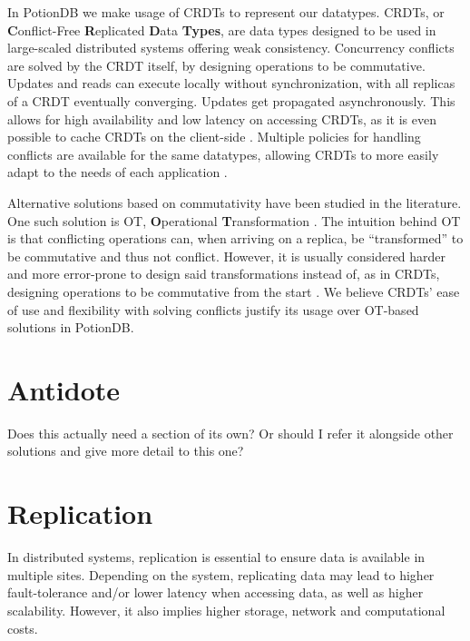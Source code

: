 In PotionDB we make usage of CRDTs \cite{crdt} to represent our datatypes.
CRDTs, or \textbf{C}onflict-Free  \textbf{R}eplicated \textbf{D}ata \textbf{Types}, are data types designed to be used in large-scaled distributed systems offering weak consistency.
Concurrency conflicts are solved by the CRDT itself, by designing operations to be commutative.
Updates and reads can execute locally without synchronization, with all replicas of a CRDT eventually converging.
Updates get propagated asynchronously.
This allows for high availability and low latency on accessing CRDTs, as it is even possible to cache CRDTs on the client-side \cite{legion, swiftcloud, castineira2015collaborative}.
Multiple policies for handling conflicts are available for the same datatypes, allowing CRDTs to more easily adapt to the needs of each application \cite{crdtMultipolicy, crdt}.

Alternative solutions based on commutativity have been studied in the literature. 
One such solution is OT, \textbf{O}perational \textbf{T}ransformation \cite{ot, otCorrectness}.
The intuition behind OT is that conflicting operations can, when arriving on a replica, be ``transformed'' to be commutative and thus not conflict.
However, it is usually considered harder and more error-prone to design said transformations instead of, as in CRDTs, designing operations to be commutative from the start \cite{otCorrectness, crdt}.
We believe CRDTs' ease of use and flexibility with solving conflicts justify its usage over OT-based solutions in PotionDB.

\section{Antidote}

Does this actually need a section of its own? Or should I refer it alongside other solutions and give more detail to this one?

\section{Replication}


In distributed systems, replication is essential to ensure data is available in multiple sites.
Depending on the system, replicating data may lead to higher fault-tolerance and/or lower latency when accessing data, as well as higher scalability.
However, it also implies higher storage, network and computational costs.

